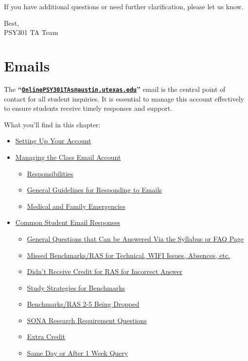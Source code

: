 \documentclass[
]{article}
\providecommand{\tightlist}{%
  \setlength{\itemsep}{0pt}\setlength{\parskip}{0pt}}
\begin{document}
If you have additional questions or need further clarification, please let us know.

Best,\\
PSY301 TA Team

\hypertarget{emails}{%
\section{Emails}\label{emails}}

The \textbf{``\href{mailto:OnlinePSY301TAs@austin.utexas.edu}{\nolinkurl{OnlinePSY301TAs@austin.utexas.edu}}''} email is the central point of contact for all student inquiries. It is essential to manage this account effectively to ensure students receive timely responses and support.

What you'll find in this chapter:

\begin{itemize}
\tightlist
\item
  \protect\hyperlink{setting-up-your-account}{Setting Up Your Account}
\item
  \protect\hyperlink{managing-the-class-email-account}{Managing the Class Email Account}

  \begin{itemize}
  \tightlist
  \item
    \protect\hyperlink{responsibilities}{Responsibilities}
  \item
    \protect\hyperlink{general-guidelines-for-responding-to-emails}{General Guidelines for Responding to Emails}
  \item
    \protect\hyperlink{medical-and-family-emergencies}{Medical and Family Emergencies}
  \end{itemize}
\item
  \protect\hyperlink{common-student-email-responses}{Common Student Email Responses}

  \begin{itemize}
  \tightlist
  \item
    \protect\hyperlink{general-questions}{General Questions that Can be Answered Via the Syllabus or FAQ Page}
  \item
    \protect\hyperlink{missed-benchmarks}{Missed Benchmarks/RAS for Technical, WIFI Issues, Absences, etc.}
  \item
    \protect\hyperlink{didnt-receive-credit}{Didn't Receive Credit for RAS for Incorrect Answer}
  \item
    \protect\hyperlink{study-strategies}{Study Strategies for Benchmarks}
  \item
    \protect\hyperlink{benchmarks-ras-dropped}{Benchmarks/RAS 2-5 Being Dropped}
  \item
    \protect\hyperlink{sona-research}{SONA Research Requirement Questions}
  \item
    \protect\hyperlink{extra-credit}{Extra Credit}
  \item
    \protect\hyperlink{same-day-query}{Same Day or After 1 Week Query}
  \end{itemize}
\end{itemize}
\end{document}
